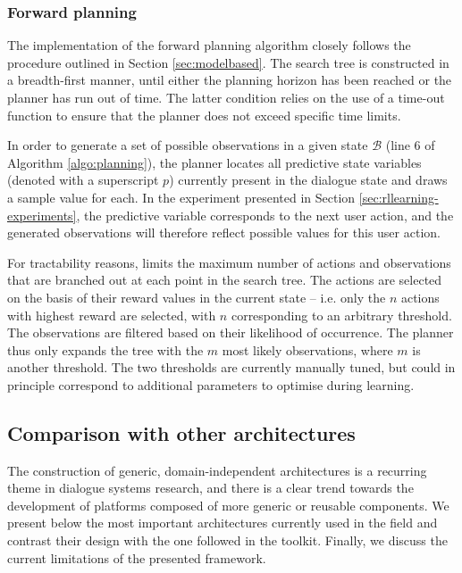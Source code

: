\subsubsection*{Forward planning}

The implementation of the forward planning algorithm closely follows the procedure outlined in Section \ref{sec:modelbased}.  The search tree is constructed in a breadth-first manner, until either the planning horizon has been reached or the planner has run out of time.  The latter condition relies on the use of a time-out function to ensure that the planner does not exceed specific time limits.

In order to generate a set of possible observations in a given state $\mathcal{B}$ (line 6 of Algorithm \ref{algo:planning}), the planner locates all predictive state variables (denoted with a superscript $p$) currently present in the dialogue state and draws a sample value for each.  In the experiment presented in Section \ref{sec:rllearning-experiments}, the predictive variable corresponds to the next user action, and the generated observations will therefore reflect possible values for this user action.

For tractability reasons, \opendial limits the maximum number of actions and observations that are branched out at each point in the search tree.  The actions are selected on the basis of their reward values in the current state -- i.e. only the $n$ actions with highest reward are selected, with $n$ corresponding to an arbitrary threshold. The observations are filtered based on their likelihood of occurrence.  The planner thus only expands the tree with the $m$ most likely observations, where $m$ is another threshold. The two thresholds are currently manually tuned, but could in principle correspond to additional parameters to optimise during learning. 

\subsection{Comparison with other architectures}
\label{sec:archi-comparison}

The construction of generic, domain-independent architectures is a recurring theme in dialogue systems research, and there is a clear trend towards the development of platforms composed of more generic or reusable components. We present below the most important architectures currently used in the field and contrast their design with the one followed in the \opendial toolkit. Finally, we discuss the current limitations of the presented framework.

